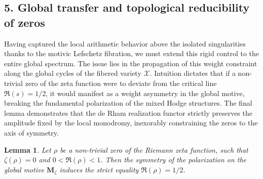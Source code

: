 \documentclass[
]{article}
\newtheorem{lemma}{Lemma}
\begin{document}
\hypertarget{global-transfer-and-topological-reducibility-of-zeros}{%
\subsection{5. Global transfer and topological reducibility of zeros}\label{global-transfer-and-topological-reducibility-of-zeros}}

Having captured the local arithmetic behavior above the isolated singularities thanks to the motivic Lefschetz fibration, we must extend this rigid control to the entire global spectrum. The issue lies in the propagation of this weight constraint along the global cycles of the fibered variety $\mathcal{X}$. Intuition dictates that if a non-trivial zero of the zeta function were to deviate from the critical line $\Re(s) = 1/2$, it would manifest as a weight asymmetry in the global motive, breaking the fundamental polarization of the mixed Hodge structures. The final lemma demonstrates that the de Rham realization functor strictly preserves the amplitude fixed by the local monodromy, inexorably constraining the zeros to the axis of symmetry.

\begin{lemma}
Let $\rho$ be a non-trivial zero of the Riemann zeta function, such that $\zeta(\rho) = 0$ and $0 < \Re(\rho) < 1$. Then the symmetry of the polarization on the global motive $\mathbf{M}_{\zeta}$ induces the strict equality $\Re(\rho) = 1/2$.
\end{lemma}
\end{document}
